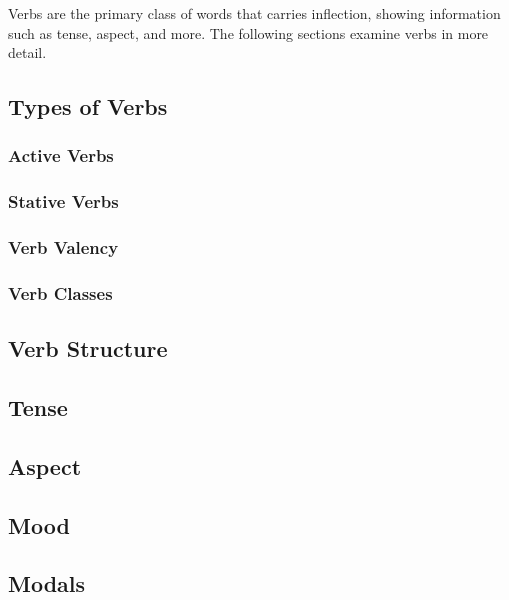 Verbs are the primary class of words that carries inflection, showing information such as tense, aspect, and more. The following sections examine \langtvk{} verbs in more detail.

\subsection{Types of Verbs}
\label{subsec:tvk-verb-types}

\subsubsection{Active Verbs}
\label{subsubsec:tvk-verb-active}

\subsubsection{Stative Verbs}
\label{subsubsec:tvk-verb-stative}

\subsubsection{Verb Valency}
\label{subsubsec:tvk-verb-valency}

\subsubsection{Verb Classes}
\label{subsubsec:tvk-verb-classes}

\subsection{Verb Structure}
\label{subsec:tvk-verb-structure}

\subsection{Tense}
\label{subsec:tvk-verb-tense}

\subsection{Aspect}
\label{subsec:tvk-verb-aspect}

\subsection{Mood}
\label{subsec:tvk-verb-mood}

\subsection{Modals}
\label{subsec:tvk-verb-modals}

